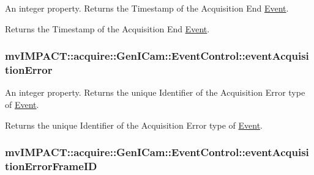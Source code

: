An integer property. Returns the Timestamp of the Acquisition End \hyperlink{classmv_i_m_p_a_c_t_1_1acquire_1_1_event}{Event}. 

Returns the Timestamp of the Acquisition End \hyperlink{classmv_i_m_p_a_c_t_1_1acquire_1_1_event}{Event}. \hypertarget{classmv_i_m_p_a_c_t_1_1acquire_1_1_gen_i_cam_1_1_event_control_aa84bdaf972d20094abb797823e639cf2}{
\subsubsection[{event\+Acquisition\+Error}]{ mv\+I\+M\+P\+A\+C\+T\+::acquire\+::\+Gen\+I\+Cam\+::\+Event\+Control\+::event\+Acquisition\+Error}}\label{classmv_i_m_p_a_c_t_1_1acquire_1_1_gen_i_cam_1_1_event_control_aa84bdaf972d20094abb797823e639cf2}


An integer property. Returns the unique Identifier of the Acquisition Error type of \hyperlink{classmv_i_m_p_a_c_t_1_1acquire_1_1_event}{Event}. 

Returns the unique Identifier of the Acquisition Error type of \hyperlink{classmv_i_m_p_a_c_t_1_1acquire_1_1_event}{Event}. \hypertarget{classmv_i_m_p_a_c_t_1_1acquire_1_1_gen_i_cam_1_1_event_control_a2be10b8cf71668b4b5044237421bcb1d}{
\subsubsection[{event\+Acquisition\+Error\+Frame\+I\+D}]{ mv\+I\+M\+P\+A\+C\+T\+::acquire\+::\+Gen\+I\+Cam\+::\+Event\+Control\+::event\+Acquisition\+Error\+Frame\+I\+D}}\label{classmv_i_m_p_a_c_t_1_1acquire_1_1_gen_i_cam_1_1_event_control_a2be10b8cf71668b4b5044237421bcb1d}


